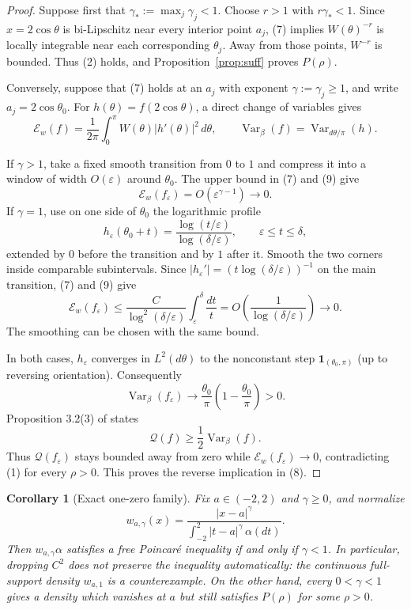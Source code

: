 \documentclass[11pt]{article}
\newtheorem{corollary}[theorem]{Corollary}
\newcommand{\Qf}{\mathcal{Q}}
\newcommand{\E}{\mathcal{E}}
\newcommand{\Var}{\operatorname{Var}}
\begin{document}
\begin{proof}
Suppose first that $\gamma_*:=\max_j\gamma_j<1$. Choose $r>1$ with
$r\gamma_*<1$. Since $x=2\cos\theta$ is bi-Lipschitz near every interior
point $a_j$, (7) implies $W(\theta)^{-r}$ is locally integrable near each
corresponding $\theta_j$. Away from those points, $W^{-r}$ is bounded.
Thus (2) holds, and Proposition~\ref{prop:suff} proves $P(\rho)$.

Conversely, suppose that (7) holds at an $a_j$ with exponent
$\gamma:=\gamma_j\ge1$, and write $a_j=2\cos\theta_0$. For
$h(\theta)=f(2\cos\theta)$, a direct change of variables gives
\[
 \E_w(f)=\frac{1}{2\pi}\int_0^\pi W(\theta)|h'(\theta)|^2\,d\theta,
 \qquad
 \Var_\beta(f)=\Var_{d\theta/\pi}(h).                       \tag{9}
\]

If $\gamma>1$, take a fixed smooth transition from $0$ to $1$ and compress
it into a window of width $O(\varepsilon)$ around $\theta_0$. The upper
bound in (7) and (9) give
\[
 \E_w(f_\varepsilon)=O(\varepsilon^{\gamma-1})\longrightarrow0. \tag{10}
\]
If $\gamma=1$, use on one side of $\theta_0$ the logarithmic profile
\[
 h_\varepsilon(\theta_0+t)=
 \frac{\log(t/\varepsilon)}{\log(\delta/\varepsilon)},
 \qquad \varepsilon\le t\le\delta,                          \tag{11}
\]
extended by $0$ before the transition and by $1$ after it. Smooth the two
corners inside comparable subintervals. Since
$|h_\varepsilon'|=(t\log(\delta/\varepsilon))^{-1}$ on the main
transition, (7) and (9) give
\[
 \E_w(f_\varepsilon)
 \le \frac{C}{\log^2(\delta/\varepsilon)}
       \int_\varepsilon^\delta\frac{dt}{t}
 =O\!\left(\frac1{\log(\delta/\varepsilon)}\right)
 \longrightarrow0.                                         \tag{12}
\]
The smoothing can be chosen with the same bound.

In both cases, $h_\varepsilon$ converges in $L^2(d\theta)$ to the
nonconstant step $\mathbf 1_{(\theta_0,\pi)}$ (up to reversing orientation).
Consequently
\[
 \Var_\beta(f_\varepsilon)\longrightarrow
 \frac{\theta_0}{\pi}\left(1-\frac{\theta_0}{\pi}\right)>0.
\]
Proposition 3.2(3) of \cite{LP} states
\[
 \Qf(f)\ge\frac12\Var_\beta(f).                             \tag{13}
\]
Thus $\Qf(f_\varepsilon)$ stays bounded away from zero while
$\E_w(f_\varepsilon)\to0$, contradicting (1) for every $\rho>0$.
This proves the reverse implication in (8).
\end{proof}

\begin{corollary}[Exact one-zero family]
Fix $a\in(-2,2)$ and $\gamma\ge0$, and normalize
\[
 w_{a,\gamma}(x)=
 \frac{|x-a|^\gamma}{\int_{-2}^2|t-a|^\gamma\,\alpha(dt)}.
\]
Then $w_{a,\gamma}\alpha$ satisfies a free Poincar\'e inequality if and
only if $\gamma<1$. In particular, dropping $C^2$ does not preserve the
inequality automatically: the continuous full-support density
$w_{a,1}$ is a counterexample. On the other hand, every
$0<\gamma<1$ gives a density which vanishes at $a$ but still satisfies
$P(\rho)$ for some $\rho>0$.
\end{corollary}
\end{document}

